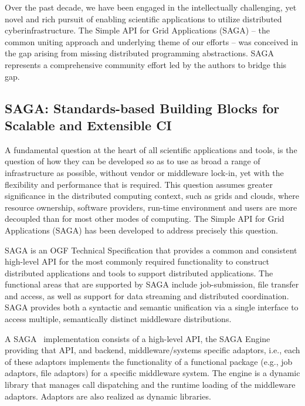 \documentclass{article}
\newcommand{\B}[1]{\textbf{#1}}
\newcommand{\jhanote}[1]{{\textcolor{red}{     \B{Shantenu:} #1 }}}
\newcommand{\jhanote}[1]{}
\begin{document}
 Over the past decade, we have been engaged in the intellectually
 challenging, yet novel and rich pursuit of enabling scientific
 applications to utilize distributed cyberinfrastructure. The Simple API
 for Grid Applications (SAGA) -- the common uniting approach and
 underlying theme of our efforts -- was conceived in the gap arising
 from missing distributed programming abstractions.  SAGA represents
 a comprehensive community effort led by the authors to bridge this gap.


\subsection{SAGA: Standards-based Building Blocks for Scalable and Extensible CI}

A fundamental question at the heart of all scientiﬁc applications and
tools, is the question of how they can be developed so as to use as
broad a range of infrastructure as possible, without vendor or
middleware lock-in, yet with the ﬂexibility and performance that is
required. This question assumes greater signiﬁcance in the distributed
computing context, such as grids and clouds, where resource ownership,
software providers, run-time environment and users are more decoupled
than for most other modes of computing.  The Simple API for Grid
Applications (SAGA) has been developed to address precisely this
question.

SAGA is an OGF Technical Specification that provides a common and
consistent high-level API for the most commonly required functionality
to construct distributed applications and tools to support distributed
applications. The functional areas that are supported by SAGA include
job-submission, file transfer and access, as well as support for data
streaming and distributed coordination.  SAGA provides both a
syntactic and semantic unification via a single interface to access
multiple, semantically distinct middleware distributions.

A SAGA~\cite{saga-url} implementation consists of a high-level API,
the SAGA Engine providing that API, and backend, middleware/systems
specific adaptors, i.e., each of these adaptors implements the
functionality of a functional package (e.g., job adaptors, ﬁle
adaptors) for a speciﬁc middleware system. The engine is a dynamic
library that manages call dispatching and the runtime loading of the
middleware adaptors. Adaptors are also realized as dynamic libraries.
\end{document}
